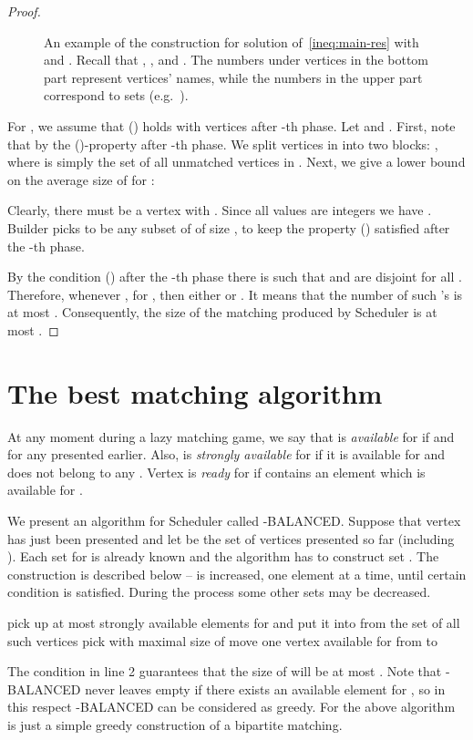 \documentclass[12pt]{amsart}
\theoremstyle{definition}
\newcommand{\Alg}[0]{\textsf{BALANCED}\xspace}
\newcommand{\Br}{Builder\xspace}
\newcommand{\Sr}{Scheduler\xspace}
\begin{document}
\begin{proof}
\begin{figure}[tbh]
\begin{center}
\begin{tikzpicture}
\end{tikzpicture}
\caption{An example of the construction for solution  of~\eqref{ineq:main-res} with  and . 
Recall that , ,  and . 
The numbers under vertices in the bottom part represent vertices' names, 
while the numbers in the upper part correspond to sets  (e.g.\ ).
}\label{fig:attack}
\end{center}
\end{figure}

For , we assume that () holds with vertices  after -th phase.
Let  and .
First, note that  by the ()-property after -th phase.
We split vertices in  into two blocks:
, where  is simply the set of all unmatched vertices in .
Next, we give a lower bound on the average size of  for :

Clearly, there must be a vertex  with .
Since all values are integers we have .
\Br picks   to be any subset of  of size ,  to keep the property () satisfied after the -th phase.

By the condition () after the -th phase there is  such that   and  are disjoint for all .
Therefore, whenever ,  for , then either  or . 
It means that the number of such 's is at most . 
Consequently, the size of the matching produced by  \Sr is at most .
\end{proof}

\section{The best matching algorithm}
\label{sect:best_alg}


At any moment during a lazy matching game, we say that  is \emph{available} for  if  and  for any  presented earlier.
Also,  is \emph{strongly available} for  if it is available for  and  does not belong to any . 
Vertex  is \emph{ready} for  if  contains an  element which is available for .

We present an algorithm for \Sr called -\Alg{}. 
Suppose that vertex  has just been presented and let  be the set of vertices presented so far (including ). 
Each set  for  is already known and the algorithm has to construct set . 
The construction is described below --  is increased, one element at a time, until certain condition is satisfied.
During the process some other sets  may be decreased.

\begin{algorithm}
\label{alg}
\caption{}
\Let  \;
pick up at most  strongly available elements for  and put it into  \; 
 { from the set of all such vertices pick  with maximal size of  \;
   move one vertex available for  from  to }
\end{algorithm}
The condition in line 2 guarantees that the size of  will be at most .
Note that -\Alg{} never leaves  empty if there exists an available element for , so in this respect -\Alg{} can be considered as greedy. 
For  the above algorithm is just a simple greedy construction of a bipartite matching.
\end{document}
